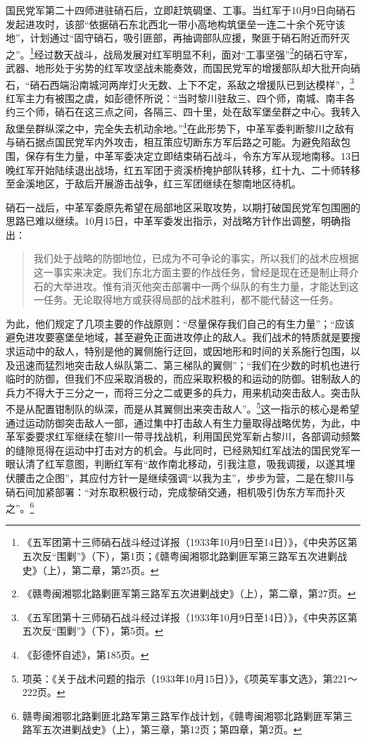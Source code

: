 国民党军第二十四师进驻硝石后，立即赶筑碉堡、工事。当红军于10月9日向硝石发起进攻时，该部“依据硝石东北西北一带小高地构筑堡垒一连二十余个死守该地”，计划通过“固守硝石，吸引匪部，再抽调部队应援，聚匪于硝石附近而歼灭之”。\footnote{《五军团第十三师硝石战斗经过详报（1933年10月9日至14日）》，《中央苏区第五次反“围剿”》（下），第1页；《赣粤闽湘鄂北路剿匪军第三路军五次进剿战史》（上），第二章，第25页。}经过数天战斗，战局发展对红军明显不利，面对“工事坚强”\footnote{《赣粤闽湘鄂北路剿匪军第三路军五次进剿战史》（上），第二章，第27页。}的硝石守军，武器、地形处于劣势的红军攻坚战未能奏效，而国民党军的增援部队却大批开向硝石，“硝石西端沿南城河两岸灯火无数、上下不定，系敌之增援队已到达模样”，\footnote{《五军团第十三师硝石战斗经过详报（1933年10月9日至14日）》，《中央苏区第五次反“围剿”》（下），第5页。}红军主力有被围之虞，如彭德怀所说：“当时黎川驻敌三、四个师，南城、南丰各约三个师，硝石在这三点之间，各隔三、四十里，处在敌军堡垒群之中心。我转入敌堡垒群纵深之中，完全失去机动余地。”\footnote{《彭德怀自述》，第185页。}在此形势下，中革军委判断黎川之敌有与硝石据点国民党军内外攻击，相互策应切断东方军后路之可能。为避免陷敌包围，保存有生力量，中革军委决定立即结束硝石战斗，令东方军从现地南移。13日晚红军开始陆续退出战场，红五军团于资溪桥掩护部队转移，红十九、二十师转移至金溪地区，于敌后开展游击战争，红三军团继续在黎南地区待机。


硝石一战后，中革军委原先希望在局部地区采取攻势，以期打破国民党军包围圈的思路已难以继续。10月15日，中革军委发出指示，对战略方针作出调整，明确指出：

\begin{quote}

我们处于战略的防御地位，已成为不可争论的事实，所以我们的战术应根据这一事实来决定。我们东北方面主要的作战任务，曾经是现在还是制止蒋介石的大举进攻。惟有消灭他突击部署中一两个纵队的有生力量，才能达到这一任务。无论取得地方或获得局部的战术胜利，都不能代替这一任务。
\end{quote}


为此，他们规定了几项主要的作战原则：“尽量保存我们自己的有生力量”；“应该避免进攻要塞堡垒地域，甚至避免正面进攻停止的敌人。我们战术的特质就是要搜求运动中的敌人，特别是他的翼侧施行迂回，或因地形和时间的关系施行包围，以及迅速而猛烈地突击敌人纵队第二、第三梯队的翼侧”；“我们在少数的时机也进行临时的防御，但我们不应采取消极的，而应采取积极的和运动的防御。钳制敌人的兵力不得大于三分之一，而将三分之二或更多的兵力，用来机动突击敌人。突击队不是从配置钳制队的纵深，而是从其翼侧出来突击敌人”。\footnote{项英：《关于战术问题的指示（1933年10月15日）》，《项英军事文选》，第221～222页。}这一指示的核心是希望通过运动防御突击敌人一部，通过集中打击敌人有生力量取得战略优势，为此，中革军委要求红军继续在黎川一带寻找战机，利用国民党军新占黎川，各部调动频繁的缝隙觅得在运动中打击对方的机会。与此同时，已经熟知红军战法的国民党军一眼认清了红军意图，判断红军有“故作南北移动，引我注意，吸我调援，以遂其埋伏腰击之企图”，其应付方针一是继续强调“以我为主”，步步为营，二是在黎川与硝石间加紧部署：“对东取积极行动，完成黎硝交通，相机吸引伪东方军而扑灭之”。\footnote{赣粤闽湘鄂北路剿匪北路军第三路军作战计划，《赣粤闽湘鄂北路剿匪军第三路军五次进剿战史》（上），第三章，第12页；第四章，第2页。}


